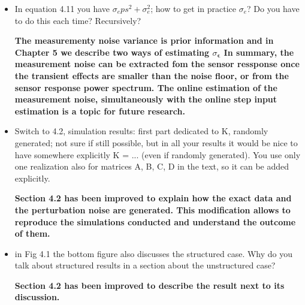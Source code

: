 \documentclass[11pt]{article}
\begin{document}
\begin{itemize}
	{\bfseries The following paragraph has been added in Section 4.1 to discuss on the need for the normality assumption.  }
	
	\color{blue}
	The normality assumption is necessary to provide more prior information into the method formulation.
    The second order Taylor series expansion (4.6) is developed considering the perturbation noise that gets into the regression matrix from the sensor transient response.
    Assuming only that the perturbation noise is distributed with zero mean and variance $\sigma_{\bm{\epsilon}}^2$ is not enough.
    If we additionally assume normality for the perturbation noise, then we benefit from the knowledge of the third moment equal to zero due to symmetry, and the fourth moment equal to three times the squared variance.
    \color{black}
	
	\item   In equation 4.11 you have $\sigma_eps^2 + \sigma_e^2$; how to get in practice $\sigma_e$? Do you have to do this each time? Recursively?
	
	{\bfseries The measurementy noise variance is prior information and in Chapter 5 we describe two ways of estimating $\sigma_{\bm{\epsilon}}$ In summary, the measurement noise can be extracted fom the sensor ressponse once the transient effects are smaller than the noise floor, or from the sensor response power spectrum. The online estimation of the measurement noise, simultaneously with the online step input estimation is a topic for future research.   }
	
	
	\item   Switch to 4.2, simulation results: first part dedicated to K, randomly generated; not sure if still possible, but in all your results it would be nice to have somewhere explicitly K = ... (even if randomly generated). You use only one realization also for matrices A, B, C, D in the text, so it can be added explicitly.
	
	{\bfseries Section 4.2 has been improved to explain how the exact data and the perturbation noise are generated. This modification allows to reproduce the simulations conducted and understand the outcome of them. }
	
	
	\item   in Fig 4.1 the bottom figure also discusses the structured case. Why do you talk about structured results in a section about the unstructured case?
	
	{\bfseries Section 4.2 has been improved to describe the result next to its discussion.  }
	

\end{itemize}
\end{document}

